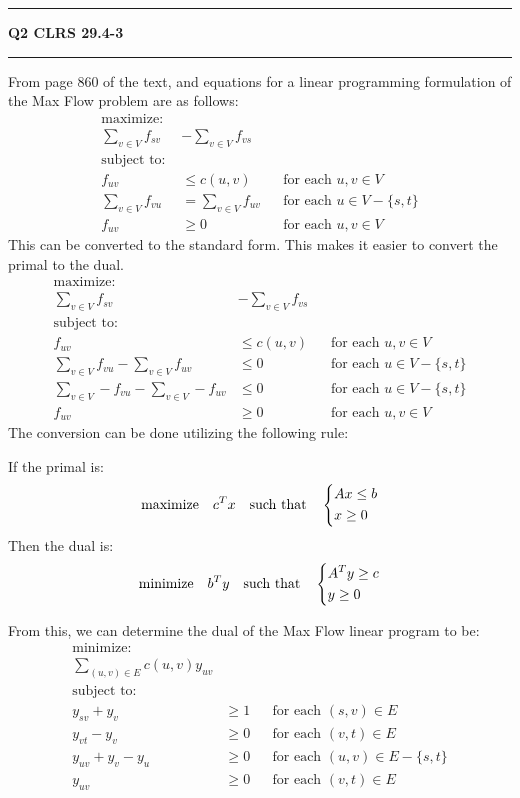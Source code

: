 \documentclass[11pt]{article}
\newcommand\question[2]{\vspace{.25in}\hrule\textbf{#1 #2}\vspace{.5em}\hrule\vspace{.10in}}
\begin{document}
\pagebreak
\question{Q2}{\;\;\;CLRS 29.4-3}
From page 860 of the text, and equations for a linear programming formulation of the Max Flow problem are as follows:
\begin{align}
\text{maximize: } \\
\sum_{v \in V}f_{sv} &- \sum_{v \in V}f_{vs} \\
\text{subject to: } \\
f_{uv} &\leq c(u,v) && \text{for each } u,v \in V \\
\sum_{v \in V}f_{vu} &= \sum_{v \in V}f_{uv} && \text{for each } u \in V - \{s,t\} \\
f_{uv} &\geq 0 && \text{for each } u,v \in V
\end{align}
This can be converted to the standard form. This makes it easier to convert the primal to the dual.
\begin{align}
\text{maximize: } \\
\sum_{v \in V}f_{sv} &- \sum_{v \in V}f_{vs} \\
\text{subject to: } \\
f_{uv} &\leq c(u,v) && \text{for each } u,v \in V \\
\sum_{v \in V}f_{vu} - \sum_{v \in V}f_{uv} &\leq 0 && \text{for each } u \in V - \{s,t\} \\
\sum_{v \in V}-f_{vu} - \sum_{v \in V}-f_{uv} &\leq 0 && \text{for each } u \in V - \{s,t\} \\
f_{uv} &\geq 0 && \text{for each } u,v \in V
\end{align}
The conversion can be done utilizing the following rule:

If the primal is:
\begin{align}
\text{maximize} \quad c^Tx \quad \text{such that} \quad
\begin{dcases}
    Ax \leq b\\
    x \geq 0
\end{dcases} 
\end{align}
Then the dual is:
\begin{align}
\text{minimize} \quad b^Ty \quad \text{such that} \quad
\begin{dcases}
    A^Ty \geq c\\
    y \geq 0
\end{dcases} 
\end{align}

From this, we can determine the dual of the Max Flow linear program to be:
\begin{align}
\text{minimize: } \\
\sum_{(u,v) \in E}c(u,v)y_{uv} \\
\text{subject to: } \\
y_{sv} + y_v & \geq 1 && \text{for each } (s,v) \in E \\
y_{vt} - y_v & \geq 0 && \text{for each } (v,t) \in E \\
y_{uv} + y_v - y_u &\geq 0 && \text{for each } (u,v) \in E - \{s,t\} \\
y_{uv} & \geq 0  && \text{for each } (v,t) \in E
\end{align}
\end{document}
